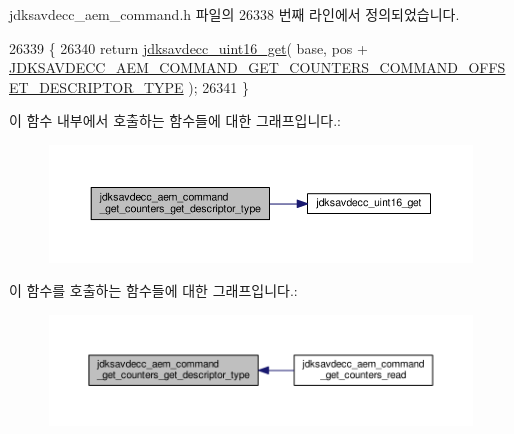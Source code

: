 jdksavdecc\+\_\+aem\+\_\+command.\+h 파일의 26338 번째 라인에서 정의되었습니다.


\begin{DoxyCode}
26339 \{
26340     \textcolor{keywordflow}{return} \hyperlink{group__endian_ga3fbbbc20be954aa61e039872965b0dc9}{jdksavdecc\_uint16\_get}( base, pos + 
      \hyperlink{group__command__get__counters_gaf358c2a51ce4e35d7c49ceda59421762}{JDKSAVDECC\_AEM\_COMMAND\_GET\_COUNTERS\_COMMAND\_OFFSET\_DESCRIPTOR\_TYPE}
       );
26341 \}
\end{DoxyCode}


이 함수 내부에서 호출하는 함수들에 대한 그래프입니다.\+:
\nopagebreak
\begin{figure}[H]
\begin{center}
\leavevmode
\includegraphics[width=350pt]{group__command__get__counters_ga9ab413475f19c19680ca91c3784fea76_cgraph}
\end{center}
\end{figure}




이 함수를 호출하는 함수들에 대한 그래프입니다.\+:
\nopagebreak
\begin{figure}[H]
\begin{center}
\leavevmode
\includegraphics[width=350pt]{group__command__get__counters_ga9ab413475f19c19680ca91c3784fea76_icgraph}
\end{center}
\end{figure}



